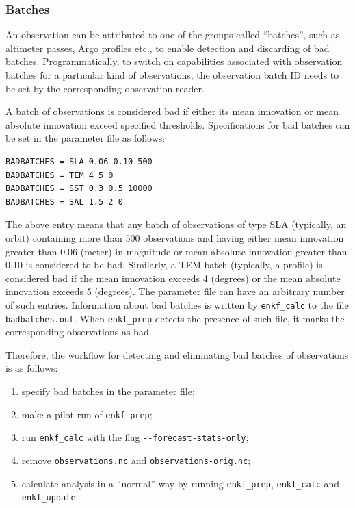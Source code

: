 \documentclass[11pt]{report}
\begin{document}
\subsubsection{Batches}

An observation can be attributed to one of the groups called ``batches'', such as altimeter passes, Argo profiles etc., to enable detection and discarding of bad batches.
Programmatically, to switch on capabilities associated with observation batches for a particular kind of observations, the observation batch ID needs to be set by the corresponding observation reader.

A batch of observations is considered bad if either its mean innovation or mean absolute innovation exceed specified thresholds.
Specifications for bad batches can be set in the parameter file as follows:
\begin{Verbatim}[frame=single,fontsize=\footnotesize]
BADBATCHES = SLA 0.06 0.10 500
BADBATCHES = TEM 4 5 0
BADBATCHES = SST 0.3 0.5 10000
BADBATCHES = SAL 1.5 2 0
\end{Verbatim}
The above entry means that any batch of observations of type SLA (typically, an orbit) containing more than 500 observations and having either mean innovation greater than 0.06 (meter) in magnitude or mean absolute innovation greater than 0.10 is considered to be bad.
Similarly, a TEM batch (typically, a profile) is considered bad if the mean innovation exceeds 4 (degrees) or the mean absolute innovation exceeds 5 (degrees).
The parameter file can have an arbitrary number of such entries.
Information about bad batches is written by \verb|enkf_calc| to the file \verb|badbatches.out|.
When \verb|enkf_prep| detects the presence of such file, it marks the corresponding observations as bad.

Therefore, the workflow for detecting and eliminating bad batches of observations is as follows:
\begin{enumerate}
\item specify bad batches in the parameter file;
\item make a pilot run of \verb|enkf_prep|;
\item run \verb|enkf_calc| with the flag \verb|--forecast-stats-only|;
\item remove \verb|observations.nc| and \verb|observations-orig.nc|;
\item calculate analysis in a ``normal'' way by running \verb|enkf_prep|, \verb|enkf_calc| and \verb|enkf_update|.
\end{enumerate}
\end{document}
